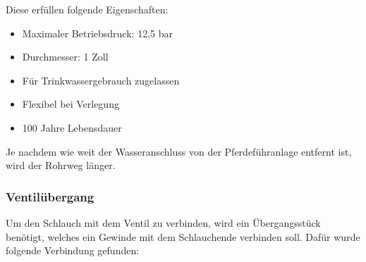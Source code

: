 Diese erfüllen folgende Eigenschaften:

\begin{itemize}
	\item{Maximaler Betriebsdruck: 12,5 bar}
	\item{Durchmesser: 1 Zoll}
	\item{Für Trinkwassergebrauch zugelassen}
	\item{Flexibel bei Verlegung}
	\item{100 Jahre Lebensdauer}
\end{itemize}


Je nachdem wie weit der Wasseranschluss von der Pferdeführanlage entfernt ist, wird der Rohrweg länger. 

\subsubsection{Ventilübergang}
\label{sec:ventiluebergang}

Um den Schlauch mit dem Ventil zu verbinden, wird ein Übergangsstück benötigt, welches ein Gewinde mit dem Schlauchende verbinden soll. Dafür wurde folgende Verbindung gefunden:

